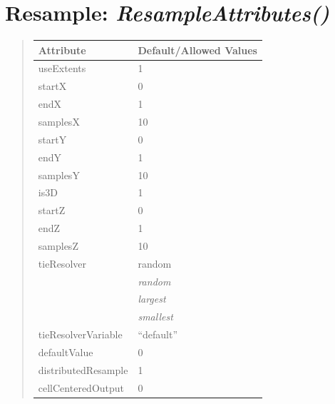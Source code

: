 \documentclass[letterpaper,10pt,english]{sphinxmanual}
\begin{document}
\section{\textbf{Resample}: \emph{ResampleAttributes()}}
\label{attributes:resample-resampleattributes}
\begin{DUlineblock}{0em}
\item[] 
\end{DUlineblock}
\begin{quote}

\begin{tabulary}{\linewidth}{|L|L|}
\hline

\textbf{Attribute}
 & 
\textbf{Default/Allowed Values}
\\
\hline
useExtents
 & 
1
\\
\hline
startX
 & 
0
\\
\hline
endX
 & 
1
\\
\hline
samplesX
 & 
10
\\
\hline
startY
 & 
0
\\
\hline
endY
 & 
1
\\
\hline
samplesY
 & 
10
\\
\hline
is3D
 & 
1
\\
\hline
startZ
 & 
0
\\
\hline
endZ
 & 
1
\\
\hline
samplesZ
 & 
10
\\
\hline
tieResolver
 & 
random
\\
\hline & 
\emph{random}
\\
\hline & 
\emph{largest}
\\
\hline & 
\emph{smallest}
\\
\hline
tieResolverVariable
 & 
``default''
\\
\hline
defaultValue
 & 
0
\\
\hline
distributedResample
 & 
1
\\
\hline
cellCenteredOutput
 & 
0
\\
\hline\end{tabulary}

\end{quote}

\begin{DUlineblock}{0em}
\item[] 
\end{DUlineblock}

\begin{DUlineblock}{0em}
\item[] 
\end{DUlineblock}
\end{document}
